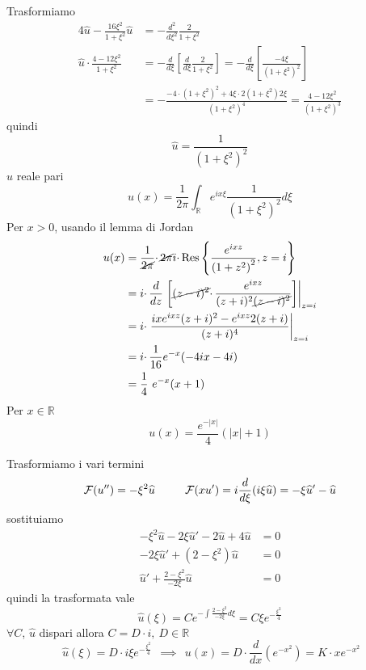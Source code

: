 Trasformiamo
\begin{align*}
4\hat{u} -\frac{16\xi ^{2}}{1+\xi ^{2}}\hat{u} & =-\frac{d^{2}}{d\xi ^{2}}\frac{2}{1+\xi ^{2}}\\
\hat{u} \cdotp \frac{4-12\xi ^{2}}{1+\xi ^{2}} & =-\frac{d}{d\xi }\left[\frac{d}{d\xi }\frac{2}{1+\xi ^{2}}\right] =-\frac{d}{d\xi }\left[\frac{-4\xi }{\left( 1+\xi ^{2}\right)^{2}}\right]\\
 & =-\frac{-4\cdotp \left( 1+\xi ^{2}\right)^{2} +4\xi \cdotp 2\left( 1+\xi ^{2}\right) 2\xi }{\left( 1+\xi ^{2}\right)^{4}} =\frac{4-12\xi ^{2}}{\left( 1+\xi ^{2}\right)^{3}}
\end{align*}
quindi
\begin{equation*}
\hat{u} =\frac{1}{\left( 1+\xi ^{2}\right)^{2}}
\end{equation*}
$\hat{u}$ reale pari
\begin{equation*}
u( x) =\frac{1}{2\pi }\int _{\mathbb{R}} e^{ix\xi }\frac{1}{\left( 1+\xi ^{2}\right)^{2}} d\xi 
\end{equation*}
Per $x >0$, usando il lemma di Jordan
\begin{align*}
u( x) & =\frac{1}{\cancel{2\pi }} \cdotp \cancel{2\pi } i\cdotp \mathrm{Res}\left\{\frac{e^{ixz}}{\left( 1+z^{2}\right)^{2}} ,z=i\right\}\\
 & =i\cdotp \frac{d}{dz}\left. \left[\cancel{( z-i)^{2}} \cdotp \frac{e^{ixz}}{( z+i)^{2}\cancel{( z-i)^{2}}}\right]\right| _{z=i}\\
 & =i\cdotp \left. \frac{ixe^{ixz}( z+i)^{2} -e^{ixz} 2( z+i)}{( z+i)^{4}}\right| _{z=i}\\
 & =i\cdotp \frac{1}{16} e^{-x}( -4ix-4i)\\
 & =\frac{1}{4} \ e^{-x}( x+1)
\end{align*}
Per $x\in \mathbb{R}$
\begin{equation*}
u( x) =\frac{e^{-| x| }}{4}(| x| +1)
\end{equation*}
\Soluzione

Trasformiamo i vari termini
\begin{equation*}
\mathcal{F} ( u'') =-\xi ^{2}\widehat{u} \ \ \ \ \ \ \ \ \mathcal{F} ( xu') =i\frac{d}{d\xi }( i\xi \widehat{u}) =-\xi \widehat{u} '-\widehat{u}
\end{equation*}
sostituiamo
\begin{align*}
-\xi ^{2}\hat{u} -2\xi \hat{u} '-2\hat{u} +4\hat{u} & =0\\
-2\xi \hat{u} '+\left( 2-\xi ^{2}\right)\hat{u} & =0\\
\hat{u} '+\frac{2-\xi ^{2}}{-2\xi }\hat{u} & =0
\end{align*}
quindi la trasformata vale
\begin{equation*}
\hat{u}( \xi ) =Ce^{-\int \frac{2-\xi ^{2}}{-2\xi } d\xi } =C\xi e^{-\frac{\xi ^{2}}{4}}
\end{equation*}
$\forall C$, $\hat{u}$ dispari allora $C=D\cdotp i,\ D\in \mathbb{R}$
\begin{equation*}
\ \hat{u}( \xi ) =D\cdotp i\xi e^{-\frac{\xi ^{2}}{4}} \ \ \implies \ \ u( x) =D\cdotp \frac{d}{dx}\left( e^{-x^{2}}\right) =K\cdotp xe^{-x^{2}}
\end{equation*}
